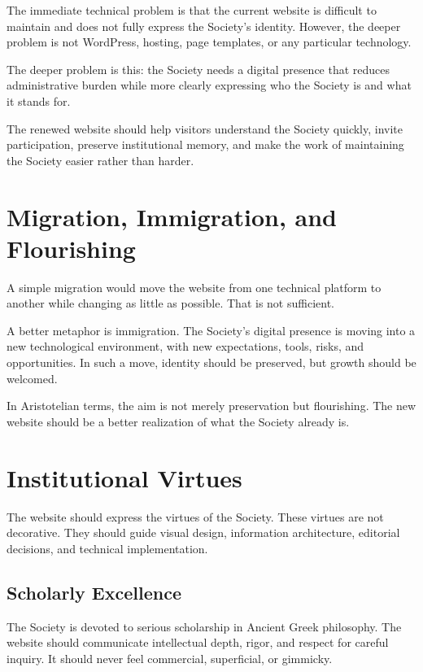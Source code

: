 \documentclass[11pt]{article}
\begin{document}
The immediate technical problem is that the current website is difficult to maintain and does not fully express the Society's identity. However, the deeper problem is not WordPress, hosting, page templates, or any particular technology.

The deeper problem is this: the Society needs a digital presence that reduces administrative burden while more clearly expressing who the Society is and what it stands for.

The renewed website should help visitors understand the Society quickly, invite participation, preserve institutional memory, and make the work of maintaining the Society easier rather than harder.

\section{Migration, Immigration, and Flourishing}

A simple migration would move the website from one technical platform to another while changing as little as possible. That is not sufficient.

A better metaphor is immigration. The Society's digital presence is moving into a new technological environment, with new expectations, tools, risks, and opportunities. In such a move, identity should be preserved, but growth should be welcomed.

In Aristotelian terms, the aim is not merely preservation but flourishing. The new website should be a better realization of what the Society already is.

\section{Institutional Virtues}

The website should express the virtues of the Society. These virtues are not decorative. They should guide visual design, information architecture, editorial decisions, and technical implementation.

\subsection{Scholarly Excellence}

The Society is devoted to serious scholarship in Ancient Greek philosophy. The website should communicate intellectual depth, rigor, and respect for careful inquiry. It should never feel commercial, superficial, or gimmicky.
\end{document}
